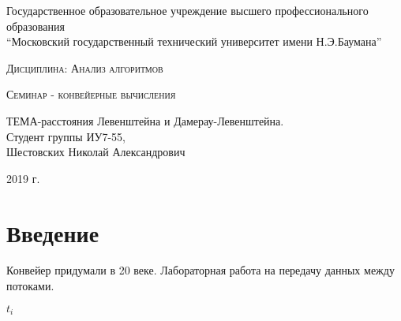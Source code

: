 \documentclass[a4paper, 14pt]{article}
\begin{document}
    \begin{titlepage}

        \begin{center}
            \large
            Государственное образовательное учреждение высшего профессионального образования\\
            “Московский государственный технический университет имени Н.Э.Баумана”
            \vspace{3cm}
            
            \textsc{Дисциплина: Анализ алгоритмов}
            \vspace{0.5cm}
                
            \textsc{Семинар - конвейерные вычисления}
            \vspace{1.5cm}
            
            {\LARGE ТЕМА-расстояния Левенштейна и Дамерау-Левенштейна.\\}
            \vspace{1.5cm}
            Студент группы ИУ7-55,\\   
            Шестовских Николай Александрович
            \vfill
            
            2019 г.
            
            \end{center}

    \end{titlepage}
\tableofcontents
	
	\newpage
	
        \section*{Введение}
        \begin{flushleft}
        \parindent=1cm
 		Конвейер придумали в 20 веке. Лабораторная работа на передачу данных между потоками. 
 		
 		$t_{i}$
        \end{flushleft}

        \label{sec:intro}
\end{document}
